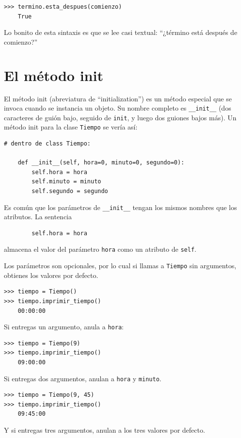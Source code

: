 \documentclass[10pt]{book}
\begin{document}
\begin{verbatim}
>>> termino.esta_despues(comienzo)
    True
\end{verbatim}
%
Lo bonito de esta sintaxis es que se lee
casi textual: ``¿término está después de comienzo?''


\section{El método init}

El método init (abreviatura de ``initialization'') es
un método especial que se invoca cuando se instancia un objeto.
Su nombre completo es \verb"__init__" (dos caracteres de guión bajo,
seguido de {\tt init}, y luego dos guiones bajos más).  Un
método init para la clase {\tt Tiempo} se vería así:

\begin{verbatim}
# dentro de class Tiempo:

    def __init__(self, hora=0, minuto=0, segundo=0):
        self.hora = hora
        self.minuto = minuto
        self.segundo = segundo
\end{verbatim}
%
Es común que los parámetros de \verb"__init__"
tengan los mismos nombres que los atributos.  La sentencia

\begin{verbatim}
        self.hora = hora
\end{verbatim}
%
almacena el valor del parámetro {\tt hora} como un atributo
de {\tt self}.

Los parámetros son opcionales, por lo cual si llamas a {\tt Tiempo} sin
argumentos, obtienes los valores por defecto.

\begin{verbatim}
>>> tiempo = Tiempo()
>>> tiempo.imprimir_tiempo()
    00:00:00
\end{verbatim}
%
Si entregas un argumento, anula a {\tt hora}:

\begin{verbatim}
>>> tiempo = Tiempo(9)
>>> tiempo.imprimir_tiempo()
    09:00:00
\end{verbatim}
%
Si entregas dos argumentos, anulan a {\tt hora} y
{\tt minuto}.

\begin{verbatim}
>>> tiempo = Tiempo(9, 45)
>>> tiempo.imprimir_tiempo()
    09:45:00
\end{verbatim}
%
Y si entregas tres argumentos, anulan a los tres
valores por defecto.
\end{document}

